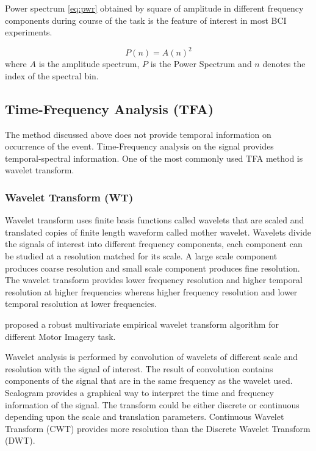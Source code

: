Power spectrum \ref{eq:pwr} obtained by square of amplitude in different frequency components during course of the task is the feature of interest in most BCI experiments.

\begin{equation} \label{eq:pwr}
    P(n) = A(n)^2
\end{equation}
where $A$ is the amplitude spectrum, $P$ is the Power Spectrum and $n$ denotes the index of the spectral bin.

\subsection{Time-Frequency Analysis (TFA)}
The method discussed above does not provide temporal information on occurrence of the event. Time-Frequency analysis on the signal provides temporal-spectral information. One of the most commonly used TFA method is wavelet transform.

\subsubsection{Wavelet Transform (WT)}
Wavelet transform uses finite basis functions called wavelets that are scaled and translated copies of finite length waveform called mother wavelet. Wavelets divide the signals of interest into different frequency components, each component can be studied at a resolution matched for its scale. A large scale component produces coarse resolution and small scale component produces fine resolution. The wavelet transform provides lower frequency resolution and higher temporal resolution at higher frequencies whereas higher frequency resolution and lower temporal resolution at lower frequencies. \par

\cite{2019_MI_MEWT} proposed a robust multivariate empirical wavelet transform algorithm for different Motor Imagery task.

Wavelet analysis is performed by convolution of wavelets of different scale and resolution with the signal of interest. The result of convolution contains components of the signal that are in the same frequency as the wavelet used. Scalogram provides a graphical way to interpret the time and frequency information of the signal. The transform could be either discrete or continuous depending upon the scale and translation parameters. Continuous Wavelet Transform (CWT) provides more resolution than the Discrete Wavelet Transform (DWT).

